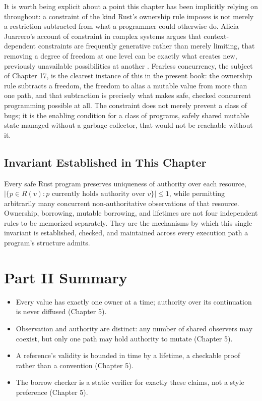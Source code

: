 \documentclass[11pt]{book}
\begin{document}
It is worth being explicit about a point this chapter has been implicitly relying on throughout: a constraint of the kind Rust's ownership rule imposes is not merely a restriction subtracted from what a programmer could otherwise do. Alicia Juarrero's account of constraint in complex systems argues that context-dependent constraints are frequently generative rather than merely limiting, that removing a degree of freedom at one level can be exactly what creates new, previously unavailable possibilities at another \cite{juarrero1999}. Fearless concurrency, the subject of Chapter 17, is the clearest instance of this in the present book: the ownership rule subtracts a freedom, the freedom to alias a mutable value from more than one path, and that subtraction is precisely what makes safe, checked concurrent programming possible at all. The constraint does not merely prevent a class of bugs; it is the enabling condition for a class of programs, safely shared mutable state managed without a garbage collector, that would not be reachable without it.

\subsection*{Invariant Established in This Chapter}

Every safe Rust program preserves uniqueness of authority over each resource, $|\{p \in R(v) : p \text{ currently holds authority over } v\}| \leq 1$, while permitting arbitrarily many concurrent non-authoritative observations of that resource. Ownership, borrowing, mutable borrowing, and lifetimes are not four independent rules to be memorized separately. They are the mechanisms by which this single invariant is established, checked, and maintained across every execution path a program's structure admits.

\clearpage

\clearpage

\section*{Part II Summary}

\begin{itemize}
\item Every value has exactly one owner at a time; authority over its continuation is never diffused (Chapter 5).
\item Observation and authority are distinct: any number of shared observers may coexist, but only one path may hold authority to mutate (Chapter 5).
\item A reference's validity is bounded in time by a lifetime, a checkable proof rather than a convention (Chapter 5).
\item The borrow checker is a static verifier for exactly these claims, not a style preference (Chapter 5).
\end{itemize}
\end{document}
